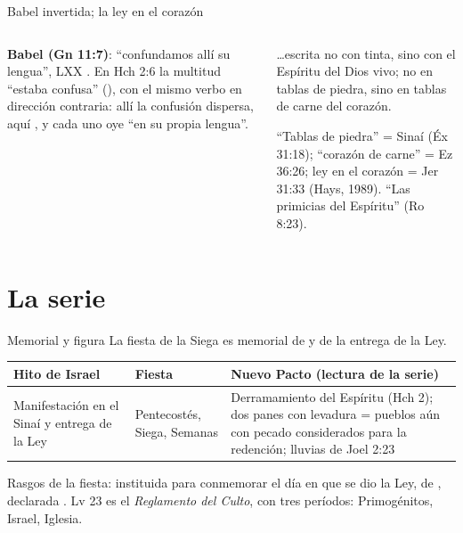 \begin{frame}{Babel invertida; la ley en el corazón}
\begin{columns}[t,onlytextwidth]
\begin{column}{0.48\textwidth}\small\RaggedRight
\textbf{Babel (Gn 11:7)}: ``confundamos allí su lengua'', LXX . En Hch 2:6 la multitud ``estaba confusa'' (), con el mismo verbo en dirección contraria: allí la confusión dispersa, aquí , y cada uno oye ``en su propia lengua''.\par\smallskip
{}
\end{column}
\begin{column}{0.50\textwidth}
\begin{cita}\ldots{}escrita no con tinta, sino con el Espíritu del Dios vivo; no en tablas de piedra, sino en tablas de carne del corazón.\end{cita}
\scriptsize\RaggedRight ``Tablas de piedra'' = Sinaí (Éx 31:18); ``corazón de carne'' = Ez 36:26; ley en el corazón = Jer 31:33 (Hays, 1989). ``Las primicias del Espíritu'' (Ro 8:23).\par
{}
\end{column}
\end{columns}
\end{frame}

\section{La serie}

\begin{frame}{Memorial y figura}
\small\RaggedRight La fiesta de la Siega es memorial de  y de la entrega de la Ley.\par\smallskip
\scriptsize\renewcommand{\arraystretch}{1.15}
\begin{tabular}{@{}L{3.0cm}L{2.3cm}L{6.6cm}@{}}
\toprule
\textbf{Hito de Israel} & \textbf{Fiesta} & \textbf{Nuevo Pacto (lectura de la serie)} \\ \midrule
Manifestación en el Sinaí y entrega de la Ley & Pentecostés, Siega, Semanas & Derramamiento del Espíritu (Hch 2); dos panes con levadura = pueblos aún con pecado considerados para la redención; lluvias de Joel 2:23 \\
\bottomrule
\end{tabular}\par\medskip
\small\RaggedRight Rasgos de la fiesta: instituida para conmemorar el día en que se dio la Ley, de , declarada . Lv 23 es el \emph{Reglamento del Culto}, con tres períodos: Primogénitos, Israel, Iglesia.
\end{frame}

